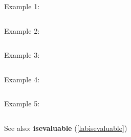 \noindent Example 1: 
\begin{center}\begin{minipage}{15cm}\begin{Verbatim}[frame=single]
\end{Verbatim}
\end{minipage}\end{center}
\noindent Example 2: 
\begin{center}\begin{minipage}{15cm}\begin{Verbatim}[frame=single]
\end{Verbatim}
\end{minipage}\end{center}
\noindent Example 3: 
\begin{center}\begin{minipage}{15cm}\begin{Verbatim}[frame=single]
\end{Verbatim}
\end{minipage}\end{center}
\noindent Example 4: 
\begin{center}\begin{minipage}{15cm}\begin{Verbatim}[frame=single]
\end{Verbatim}
\end{minipage}\end{center}
\noindent Example 5: 
\begin{center}\begin{minipage}{15cm}\begin{Verbatim}[frame=single]
\end{Verbatim}
\end{minipage}\end{center}
See also: \textbf{isevaluable} (\ref{labisevaluable})
